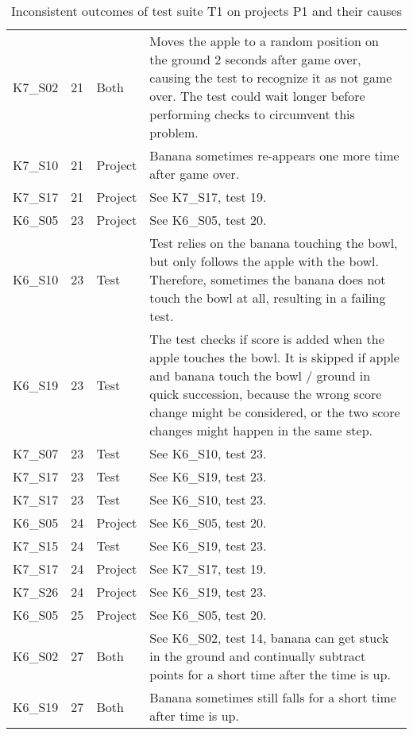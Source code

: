 \begin{table}[htpb]
\begin{tabular}{lrlp{10.5cm}}
        K7\_S02 & 21   & Both    & Moves the apple to a random position on the ground 2 seconds after game over, causing the test to recognize it as not game over.
                                   The test could wait longer before performing checks to circumvent this problem. \\
        K7\_S10 & 21   & Project & Banana sometimes re-appears one more time after game over. \\
        K7\_S17 & 21   & Project & See K7\_S17, test 19. \\

        K6\_S05 & 23   & Project & See K6\_S05, test 20. \\
        K6\_S10 & 23   & Test    & Test relies on the banana touching the bowl, but only follows the apple with the bowl.
                                   Therefore, sometimes the banana does not touch the bowl at all, resulting in a failing test. \\
        K6\_S19 & 23   & Test    & The test checks if score is added when the apple touches the bowl.
                                   It is skipped if apple and banana touch the bowl / ground in quick succession,
                                   because the wrong score change might be considered, or the two score changes might happen in the same step. \\
        K7\_S07 & 23   & Test    & See K6\_S10, test 23. \\
        K7\_S17 & 23   & Test    & See K6\_S19, test 23. \\
        K7\_S17 & 23   & Test    & See K6\_S10, test 23. \\

        K6\_S05 & 24   & Project & See K6\_S05, test 20. \\
        K7\_S15 & 24   & Test    & See K6\_S19, test 23. \\

        K7\_S17 & 24   & Project & See K7\_S17, test 19. \\
        K7\_S26 & 24   & Project & See K6\_S19, test 23. \\

        K6\_S05 & 25   & Project & See K6\_S05, test 20. \\

        K6\_S02 & 27   & Both    & See K6\_S02, test 14, banana can get stuck in the ground and continually subtract points for a short time after the time is up. \\

        K6\_S19 & 27   & Both    & Banana sometimes still falls for a short time after time is up. \\
        \bottomrule
    \end{tabular}
    \caption{Inconsistent outcomes of test suite T1 on projects P1 and their causes}
    \label{tab:inconsistencies_causes_normal}
\end{table}

